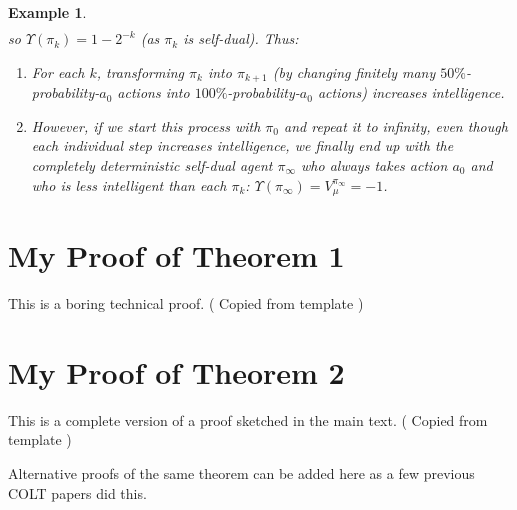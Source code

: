 \documentclass[twoside]{article}
\newtheorem{example}[theorem]{Example}
\begin{document}
\begin{example}
\begin{align*}
    \end{align*}
    so $\Upsilon(\pi_k)=1-2^{-k}$ (as $\pi_k$ is self-dual).
    Thus:
    \begin{enumerate}
        \item For each $k$, transforming $\pi_k$ into $\pi_{k+1}$
            (by changing finitely many $50\%$-probability-$a_0$
            actions into $100\%$-probability-$a_0$ actions)
            \emph{increases} intelligence.
        \item However, if we start this process with $\pi_0$ and
            repeat it to infinity, even though each individual step
            \emph{increases} intelligence, we finally end up with
            the completely deterministic
            self-dual agent $\pi_{\infty}$ who always takes action $a_0$ and who is
            \emph{less} intelligent than each $\pi_k$:
            $\Upsilon(\pi_{\infty})=V^{\pi_\infty}_\mu=-1$.
    \end{enumerate}
\end{example}



\appendix

\section{My Proof of Theorem 1}

This is a boring technical proof. ( Copied from template )

\section{My Proof of Theorem 2}

This is a complete version of a proof sketched in the main text.
( Copied from template )

 Alternative proofs of the same theorem can be added here as a few previous COLT papers did this.
\end{document}
